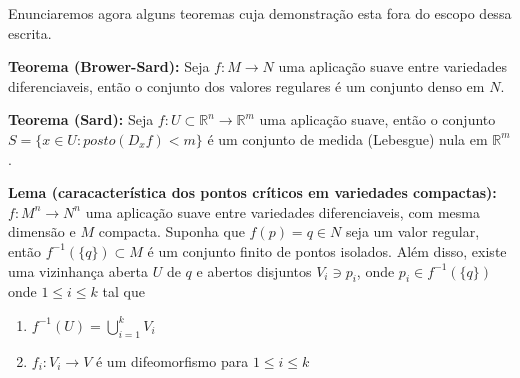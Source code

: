 \documentclass{article}
\begin{document}
	Enunciaremos agora alguns teoremas cuja demonstração esta fora do escopo dessa escrita.
	
	\vspace{2mm}
	\textbf{Teorema (Brower-Sard):} Seja $f: M \to N$ uma aplicação suave entre variedades diferenciaveis, então o conjunto dos valores regulares é um conjunto denso em $N$.
	
	\vspace{2mm}
	\textbf{Teorema (Sard):} Seja $f: U \subset \mathbb{R}^{n} \to \mathbb{R}^{m}$ uma aplicação suave, então o conjunto $S = \{x \in U: posto(D_{x}f) < m\}$ é um conjunto de medida (Lebesgue) nula em $\mathbb{R}^{m}$.
	
	\vspace{2mm}
	\textbf{Lema (caracacterística dos pontos críticos em variedades compactas):} $f: M^{n} \to N^{n}$ uma aplicação suave entre variedades diferenciaveis, com mesma dimensão e $M$ compacta. Suponha que $f(p) = q \in N$ seja um valor regular, então $f^{-1}(\{q\}) \subset M$ é um conjunto finito de pontos isolados. Além disso, existe uma vizinhança aberta $U$ de $q$ e abertos disjuntos $V_{i} \ni p_{i}$, onde $p_{i} \in f^{-1}(\{q\})$ onde $1 \leq i \leq k$ tal que 
	\begin{enumerate}
		\item $f^{-1}(U) = \bigcup \limits_{i=1}^{k} V_{i}$
		
		\item $f_{i}:V_{i} \to V$ é um difeomorfismo para $1 \leq i \leq k$
	\end{enumerate}
\end{document}

